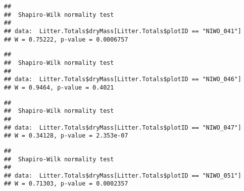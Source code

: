 \documentclass[
]{article}
\newenvironment{Shaded}{\begin{snugshade}}{\end{snugshade}}
\newcommand{\KeywordTok}[1]{\textcolor[rgb]{0.13,0.29,0.53}{\textbf{#1}}}
\newcommand{\NormalTok}[1]{#1}
\newcommand{\OperatorTok}[1]{\textcolor[rgb]{0.81,0.36,0.00}{\textbf{#1}}}
\newcommand{\StringTok}[1]{\textcolor[rgb]{0.31,0.60,0.02}{#1}}
\begin{document}
\begin{verbatim}
## 
##  Shapiro-Wilk normality test
## 
## data:  Litter.Totals$dryMass[Litter.Totals$plotID == "NIWO_041"]
## W = 0.75222, p-value = 0.0006757
\end{verbatim}

\begin{Shaded}
\end{Shaded}

\begin{verbatim}
## 
##  Shapiro-Wilk normality test
## 
## data:  Litter.Totals$dryMass[Litter.Totals$plotID == "NIWO_046"]
## W = 0.9464, p-value = 0.4021
\end{verbatim}

\begin{Shaded}
\end{Shaded}

\begin{verbatim}
## 
##  Shapiro-Wilk normality test
## 
## data:  Litter.Totals$dryMass[Litter.Totals$plotID == "NIWO_047"]
## W = 0.34128, p-value = 2.353e-07
\end{verbatim}

\begin{Shaded}
\end{Shaded}

\begin{verbatim}
## 
##  Shapiro-Wilk normality test
## 
## data:  Litter.Totals$dryMass[Litter.Totals$plotID == "NIWO_051"]
## W = 0.71303, p-value = 0.0002357
\end{verbatim}

\begin{Shaded}
\end{Shaded}
\end{document}
